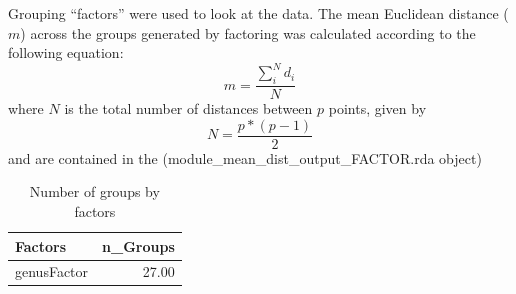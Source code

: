\documentclass{article}
\begin{document}
Grouping ``factors'' were used to look at the data. The mean Euclidean distance ($m$) across the groups generated by factoring was calculated
    according to the following equation:
 \begin{equation} m =  \frac{\sum_i^N d_i}{N}\end{equation} where $N$ is the total number of distances between $p$ points, given by
      \begin{equation} N = \frac{p*(p-1)}{2} \end{equation}
 and are contained in the (module\_mean\_dist\_output\_FACTOR.rda object)\\
\begin{table}[ht]
\centering
\begin{tabular}{lr}
  \hline
Factors & n\_Groups \\ 
  \hline
genusFactor & 27.00 \\ 
   \hline
\end{tabular}
\caption{Number of groups by factors} 
\label{tab:Factors}
\end{table}
\FloatBarrier
\end{document}
